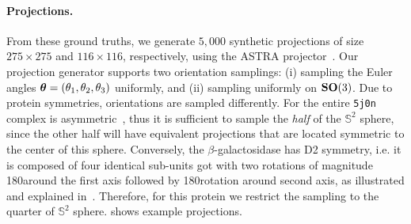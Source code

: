 \paragraph{Projections.}
From these ground truths, we generate $5,000$ synthetic projections of size $275\times 275$ and $116\times 116$, respectively, using the ASTRA projector~\cite{van2015astra}.
Our projection generator supports two orientation samplings: (i) sampling the Euler angles ${\boldsymbol{\theta}}=(\theta_1,\theta_2,\theta_3)$ uniformly, and (ii) sampling uniformly on $\mathrm{\mathbf{SO}}(3)$.
Due to protein symmetries, orientations are sampled differently. For the entire \texttt{5j0n} complex is asymmetric~\cite{doi:10.1002/9780470514160.ch4}, thus it is sufficient to sample the \textit{half} of the $\mathbb{S}^2$ sphere, since the other half will have equivalent projections that are located symmetric to the center of this sphere. Conversely, the $\beta$-galactosidase has D2 symmetry, i.e. it is composed of four identical sub-units got with two rotations of magnitude 180\degree around the first axis followed by 180\degree rotation around second axis, as illustrated and explained in~\cite{symmetry_in_protein,symmetry,scipion-em-github, rcsb-symmetry-view, EmpereurMot2019GeometricDO}. Therefore, for this protein we restrict the sampling to the quarter of $\mathbb{S}^2$ sphere.
 shows example projections.

